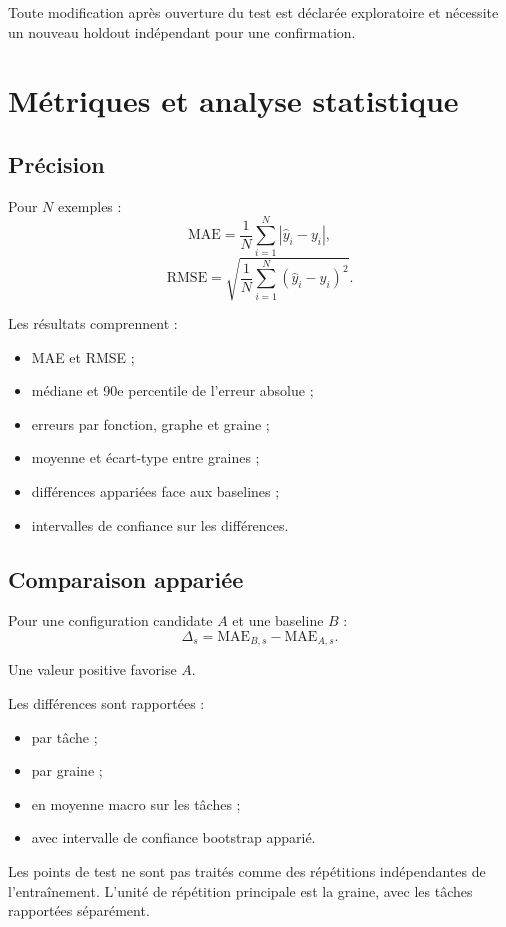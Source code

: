 \documentclass[11pt,a4paper]{article}
\newcommand{\MAE}{\mathrm{MAE}}
\newcommand{\RMSE}{\mathrm{RMSE}}
\begin{document}
Toute modification après ouverture du test est déclarée exploratoire
et nécessite un nouveau holdout indépendant pour une confirmation.

\section{Métriques et analyse statistique}

\subsection{Précision}

Pour $N$ exemples :
\[
\MAE=\frac{1}{N}\sum_{i=1}^{N}|\hat y_i-y_i|,
\]
\[
\RMSE=
\sqrt{\frac{1}{N}\sum_{i=1}^{N}(\hat y_i-y_i)^2}.
\]

Les résultats comprennent :
\begin{itemize}
  \item MAE et RMSE ;
  \item médiane et 90e percentile de l'erreur absolue ;
  \item erreurs par fonction, graphe et graine ;
  \item moyenne et écart-type entre graines ;
  \item différences appariées face aux baselines ;
  \item intervalles de confiance sur les différences.
\end{itemize}

\subsection{Comparaison appariée}

Pour une configuration candidate $A$ et une baseline $B$ :
\[
\Delta_s=\MAE_{B,s}-\MAE_{A,s}.
\]

Une valeur positive favorise $A$.

Les différences sont rapportées :
\begin{itemize}
  \item par tâche ;
  \item par graine ;
  \item en moyenne macro sur les tâches ;
  \item avec intervalle de confiance bootstrap apparié.
\end{itemize}

Les points de test ne sont pas traités comme des répétitions
indépendantes de l'entraînement. L'unité de répétition principale
est la graine, avec les tâches rapportées séparément.
\end{document}
